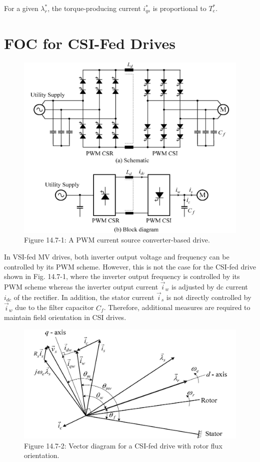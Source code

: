\documentclass[letterpaper,12pt]{article}
\begin{document}
For a given $\lambda_r^*$, the torque-producing current $i_{qs}^*$ is proportional to $T_e^*$.

\section{FOC for CSI-Fed Drives}

\begin{figure}[h]
\centering
\includegraphics{graficos/img20.jpg}
\caption{Figure 14.7-1: A PWM current source converter-based drive.}
\end{figure}
\FloatBarrier

In VSI-fed MV drives, both inverter output voltage and frequency can be controlled by its PWM scheme. However, this is not the case for the CSI-fed drive shown in Fig. 14.7-1, where the inverter output frequency is controlled by its PWM scheme whereas the inverter output current $\vec{i}_w$ is adjusted by dc current $i_{dc}$ of the rectifier. In addition, the stator current $\vec{i}_s$ is not directly controlled by $\vec{i}_w$ due to the filter capacitor $C_f$. Therefore, additional measures are required to maintain field orientation in CSI drives.

\begin{figure}[h]
\centering
\includegraphics{graficos/img21.jpg}
\caption{Figure 14.7-2: Vector diagram for a CSI-fed drive with rotor flux orientation.}
\end{figure}
\FloatBarrier
\end{document}
